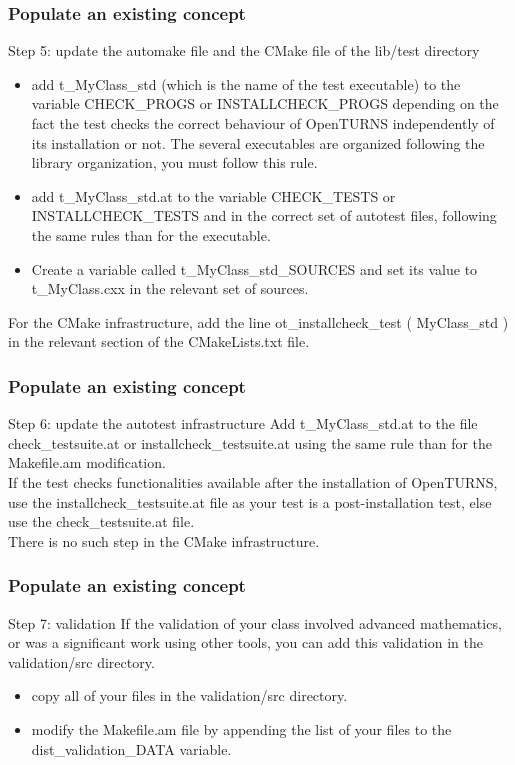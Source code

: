 \documentclass[8pt]{beamer}
\begin{document}
\begin{frame}
  \frametitle{Populate an existing concept}
  \begin{block}{Step 5: update the automake file and the CMake file of the lib/test directory}
  \begin{itemize}
  \item add t\_MyClass\_std (which is the name of the test executable) to the variable CHECK\_PROGS or INSTALLCHECK\_PROGS depending on the fact the test checks the correct behaviour of OpenTURNS independently of its installation or not. The several executables are organized following the library organization, you must follow this rule.
  \item add t\_MyClass\_std.at to the variable CHECK\_TESTS or INSTALLCHECK\_TESTS and in the correct set of autotest files, following the same rules than for the executable.
  \item Create a variable called t\_MyClass\_std\_SOURCES and set its value to t\_MyClass.cxx in the relevant set of sources.
  \end{itemize}
  For the CMake infrastructure, add the line ot\_installcheck\_test ( MyClass\_std ) in the relevant section of the CMakeLists.txt file.
  \end{block}
\end{frame}
\begin{frame}
  \frametitle{Populate an existing concept}
  \begin{block}{Step 6: update the autotest infrastructure}
    Add t\_MyClass\_std.at to the file check\_testsuite.at or installcheck\_testsuite.at using the same rule than for the Makefile.am modification.\\
    If the test checks functionalities available after the installation of OpenTURNS, use the installcheck\_testsuite.at file as your test is a post-installation test, else use the check\_testsuite.at file.\\
    There is no such step in the CMake infrastructure.
  \end{block}
\end{frame}
\begin{frame}
  \frametitle{Populate an existing concept}
  \begin{block}{Step 7: validation}
    If the validation of your class involved advanced mathematics, or was a significant work using other tools, you can add this validation in the validation/src directory.
    \begin{itemize}
    \item copy all of your files in the validation/src directory.
    \item modify the Makefile.am file by appending the list of your files to the dist\_validation\_DATA variable.
    \end{itemize}
  \end{block}
\end{frame}
\end{document}
